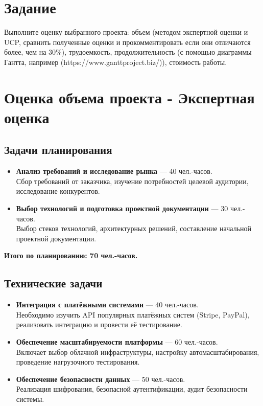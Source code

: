 \documentclass[14pt, russian]{matmex-diploma-custom}
\begin{document}

\maketitle
\section*{Задание}
Выполните оценку выбранного проекта: объем (методом экспертной оценки и UCP, сравнить полученные оценки и прокомментировать если они отличаются более, чем на 30\%), трудоемкость, продолжительность (с помощью диаграммы Гантта, например (https://www.ganttproject.biz/)), стоимость работы.

\section{Оценка объема проекта - Экспертная оценка}

\subsection{Задачи планирования}

\begin{itemize}
    \item \textbf{Анализ требований и исследование рынка} — 40 чел.-часов.\\
    Сбор требований от заказчика, изучение потребностей целевой аудитории, исследование конкурентов.

    \item \textbf{Выбор технологий и подготовка проектной документации} — 30 чел.-часов.\\
    Выбор стеков технологий, архитектурных решений, составление начальной проектной документации.
\end{itemize}

\textbf{Итого по планированию: 70 чел.-часов.}

\subsection{Технические задачи}
\begin{itemize}
    \item \textbf{Интеграция с платёжными системами} — 40 чел.-часов.\\
    Необходимо изучить API популярных платёжных систем (Stripe, PayPal), реализовать интеграцию и провести её тестирование.

    \item \textbf{Обеспечение масштабируемости платформы} — 60 чел.-часов.\\
    Включает выбор облачной инфраструктуры, настройку автомасштабирования, проведение нагрузочного тестирования.

    \item \textbf{Обеспечение безопасности данных} — 50 чел.-часов.\\
    Реализация шифрования, безопасной аутентификации, аудит безопасности системы.
\end{itemize}
\end{document}

